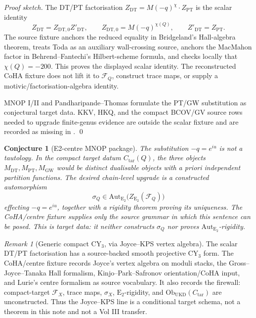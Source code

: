 \documentclass[12pt]{amsart}
\newtheorem{conj}[thm]{Conjecture}
\theoremstyle{remark}
\newtheorem{rmk}[thm]{Remark}
\providecommand{\E}{\mathrm{E}}
\providecommand{\DT}{\mathrm{DT}}
\providecommand{\PT}{\mathrm{PT}}
\providecommand{\GW}{\mathrm{GW}}
\providecommand{\Aut}{\mathrm{Aut}}
\providecommand{\cF}{\mathcal{F}}
\begin{document}
\begin{proof}[Proof sketch]
  The DT/PT factorisation $Z_{\DT} = M(-q)^{\chi} \cdot Z_{\PT}$ is
  the scalar identity
  \[
    Z_{\DT}=Z_{\DT,0}Z'_{\DT},\qquad
    Z_{\DT,0}=M(-q)^{\chi(Q)},\qquad
    Z'_{\DT}=Z_{\PT}.
  \]
  The source fixture anchors the reduced equality in Bridgeland's
  Hall-algebra theorem, treats Toda as an auxiliary wall-crossing source,
  anchors the MacMahon factor in Behrend--Fantechi's Hilbert-scheme
  formula, and checks locally that \(\chi(Q)=-200\). This proves the
  displayed scalar identity. The reconstructed CoHA fixture does not lift
  it to \(\cF_Q\), construct trace maps, or supply a
  motivic/factorisation-algebra identity.

  MNOP I/II and Pandharipande--Thomas formulate the PT/GW substitution
  as conjectural target data. KKV, HKQ, and the compact BCOV/GV source
  rows needed to upgrade finite-genus evidence are outside the scalar
  fixture and are recorded as missing in
  .
  \qed
\end{proof}

\begin{conj}[E2-centre MNOP package]\label{conj:e2-centre-mnop-package}
  The substitution $-q = e^{iu}$ is not a tautology. In the compact
  target datum \(C_{\mathrm{tar}}(Q)\), the three objects
  $M_{\DT}, M_{\PT}, M_{\GW}$ would be distinct dualisable objects with
  a priori independent partition functions.  The desired
  chain-level upgrade is a constructed automorphism
  \[
    \sigma_Q\in\Aut_{\E_2}\bigl(Z_{\E_2}(\cF_Q)\bigr)
  \]
  effecting \(-q=e^{iu}\), together with a rigidity theorem proving its
  uniqueness.  The CoHA/centre fixture supplies only the source grammar
  in which this sentence can be posed. This is target data: it neither
  constructs \(\sigma_Q\) nor proves \(\Aut_{\E_2}\)-rigidity.
\end{conj}

\begin{rmk}[Generic compact CY$_3$, via Joyce--KPS vertex algebra]
  The scalar DT/PT factorisation has a source-backed smooth projective
  CY$_3$ form. The CoHA/centre fixture
  records Joyce's vertex algebra on moduli stacks, the
  Gross--Joyce--Tanaka Hall formalism, Kinjo--Park--Safronov
  orientation/CoHA input, and Lurie's centre formalism as source
  vocabulary. It also records the firewall: compact-target \(\cF_X\),
  trace maps, \(\sigma_X\), \(\E_2\)-rigidity, and
  \(\mathrm{Ob}_{\mathrm{UKD}}(C_{\mathrm{tar}})\) are unconstructed.
  Thus the Joyce--KPS line is a conditional target schema, not a theorem
  in this note and not a Vol III transfer.
\end{rmk}
\end{document}
